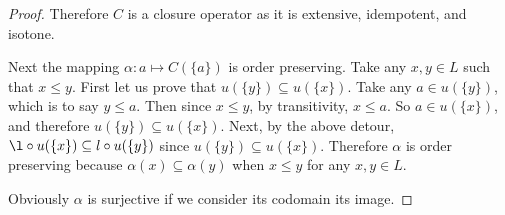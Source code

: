 \begin{proof}
Therefore $C$ is a closure operator as it is extensive, idempotent, and isotone.

Next the mapping $\alpha:a \mapsto C(\{a\})$ is order preserving.
Take any $x, y \in L$ such that $x \leq y$.
First let us prove that $u(\{y\}) \subseteq u(\{x\})$.
Take any $a\in u(\{y\})$, which is to say $y \leq a$.
Then since $x \leq y$, by transitivity, $x \leq a$.
So $a\in u(\{x\})$, and therefore $u(\{y\}) \subseteq u(\{x\})$.
Next, by the above detour, $\l\circ u(\{x\}) \subseteq l\circ u(\{y\}) $  since $u(\{y\}) \subseteq u(\{x\})$.
Therefore $\alpha$ is order preserving because $\alpha(x) \subseteq \alpha(y)$ when $x \leq y$ for any $x,y \in L$.

Obviously $\alpha$ is surjective if we consider its codomain its image. 


\end{proof}

